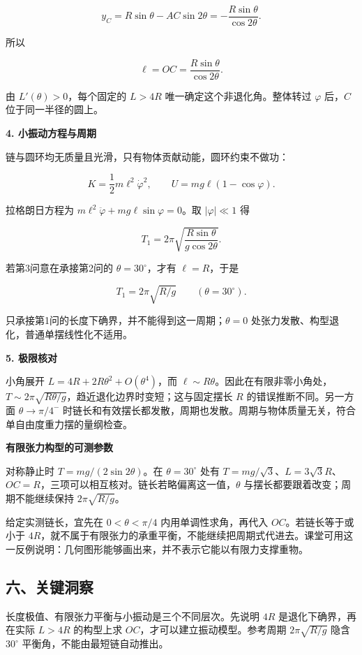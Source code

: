 \documentclass[12pt,a4paper,UTF8]{ctexart}
\begin{document}
\[y_C=R\sin\theta-AC\sin2\theta=-\frac{R\sin\theta}{\cos2\theta}.\]

所以

\[\boxed{\ell=OC=\frac{R\sin\theta}{\cos2\theta}}.\]

由 \(L'(\theta)>0\)，每个固定的 \(L>4R\) 唯一确定这个非退化角。整体转过
\(\varphi\) 后，\(C\) 位于同一半径的圆上。

\textbf{4. 小振动方程与周期}

链与圆环均无质量且光滑，只有物体贡献动能，圆环约束不做功：

\[K=\frac12m\ell^2\dot\varphi^2,\qquad U=mg\ell(1-\cos\varphi).\]

拉格朗日方程为 \(m\ell^2\ddot\varphi+mg\ell\sin\varphi=0\)。取
\(|\varphi|\ll1\) 得

\[\boxed{T_1=2\pi\sqrt{\frac{R\sin\theta}{g\cos2\theta}}}.\]

若第3问意在承接第2问的 \(\theta=30^\circ\)，才有 \(\ell=R\)，于是

\[\boxed{T_1=2\pi\sqrt{R/g}}\qquad(\theta=30^\circ).\]

只承接第1问的长度下确界，并不能得到这一周期；\(\theta=0\)
处张力发散、构型退化，普通单摆线性化不适用。

\textbf{5. 极限核对}

小角展开 \(L=4R+2R\theta^2+O(\theta^4)\)，而
\(\ell\sim R\theta\)。因此在有限非零小角处，\(T\sim2\pi\sqrt{R\theta/g}\)，趋近退化边界时变短；这与固定摆长
\(R\) 的错误推断不同。另一方面 \(\theta\to\pi/4^-\)
时链长和有效摆长都发散，周期也发散。周期与物体质量无关，符合单自由度重力摆的量纲检查。

\textbf{有限张力构型的可测参数}

对称静止时 \(T=mg/(2\sin2\theta)\)。在 \(\theta=30^\circ\) 处有
\(T=mg/\sqrt3\)、\(L=3\sqrt3R\)、\(OC=R\)，三项可以相互核对。链长若略偏离这一值，\(\theta\)
与摆长都要跟着改变；周期不能继续保持 \(2\pi\sqrt{R/g}\)。

给定实测链长，宜先在 \(0<\theta<\pi/4\) 内用单调性求角，再代入
\(OC\)。若链长等于或小于
\(4R\)，就不属于有限张力的承重平衡，不能继续把周期式代进去。课堂可用这一反例说明：几何图形能够画出来，并不表示它能以有限力支撑重物。

\subsection{六、关键洞察}\label{ux516dux5173ux952eux6d1eux5bdf-6}

长度极值、有限张力平衡与小振动是三个不同层次。先说明 \(4R\)
是退化下确界，再在实际 \(L>4R\) 的构型上求
\(OC\)，才可以建立振动模型。参考周期 \(2\pi\sqrt{R/g}\) 隐含
\(30^\circ\) 平衡角，不能由最短链自动推出。
\end{document}

